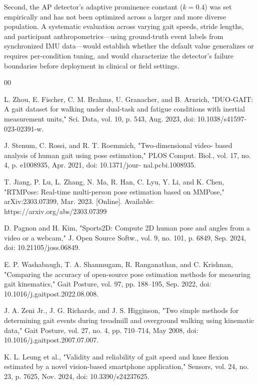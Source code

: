 \documentclass[conference]{IEEEtran}
\begin{document}
Second, the AP detector's adaptive prominence constant ($k = 0.4$) was set empirically and has not been optimized across a larger and more diverse population. A systematic evaluation across varying gait speeds, stride lengths, and participant anthropometrics—using ground-truth event labels from synchronized IMU data—would establish whether the default value generalizes or requires per-condition tuning, and would characterize the detector's failure boundaries before deployment in clinical or field settings.

\begin{thebibliography}{00}

L. Zhou, E. Fischer, C. M. Brahms, U. Granacher, and B. Arnrich,
"DUO-GAIT: A gait dataset for walking under dual-task and fatigue
conditions with inertial measurement units," Sci. Data, vol. 10, p. 543,
Aug. 2023, doi: 10.1038/s41597-023-02391-w.

J. Stenum, C. Rossi, and R. T. Roemmich, "Two-dimensional video-
based analysis of human gait using pose estimation," PLOS Comput.
Biol., vol. 17, no. 4, p. e1008935, Apr. 2021, doi: 10.1371/jour-
nal.pcbi.1008935.

T. Jiang, P. Lu, L. Zhang, N. Ma, R. Han, C. Lyu, Y. Li, and
K. Chen, "RTMPose: Real-time multi-person pose estimation based
on MMPose," arXiv:2303.07399, Mar. 2023. [Online]. Available:
https://arxiv.org/abs/2303.07399

D. Pagnon and H. Kim, "Sports2D: Compute 2D human pose and angles
from a video or a webcam," J. Open Source Softw., vol. 9, no. 101, p.
6849, Sep. 2024, doi: 10.21105/joss.06849.

E. P. Washabaugh, T. A. Shanmugam, R. Ranganathan, and C. Krishnan,
"Comparing the accuracy of open-source pose estimation methods for
measuring gait kinematics," Gait Posture, vol. 97, pp. 188–195, Sep.
2022, doi: 10.1016/j.gaitpost.2022.08.008.

J. A. Zeni Jr., J. G. Richards, and J. S. Higginson, "Two simple methods
for determining gait events during treadmill and overground walking using
kinematic data," Gait Posture, vol. 27, no. 4, pp. 710--714, May 2008,
doi: 10.1016/j.gaitpost.2007.07.007.

K. L. Leung et al., "Validity and reliability of gait speed and knee flexion
estimated by a novel vision-based smartphone application," Sensors, vol.
24, no. 23, p. 7625, Nov. 2024, doi: 10.3390/s24237625.

\end{thebibliography}
\end{document}
